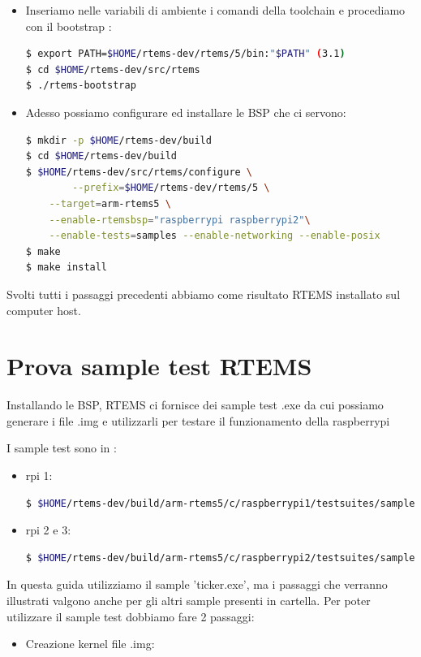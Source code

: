 \documentclass[12pt, a4paper]{article}
\begin{document}
\begin{flushleft}
\begin{itemize}
\item Inseriamo nelle variabili di ambiente i comandi della toolchain e procediamo con il bootstrap : 
\begin{lstlisting}[language=bash] 
$ export PATH=$HOME/rtems-dev/rtems/5/bin:"$PATH" (3.1)
$ cd $HOME/rtems-dev/src/rtems
$ ./rtems-bootstrap
\end{lstlisting}	
	
\item Adesso possiamo configurare ed installare le BSP che ci servono: 
\begin{lstlisting}[language=bash] 
$ mkdir -p $HOME/rtems-dev/build
$ cd $HOME/rtems-dev/build
$ $HOME/rtems-dev/src/rtems/configure \
        --prefix=$HOME/rtems-dev/rtems/5 \
	--target=arm-rtems5 \
	--enable-rtemsbsp="raspberrypi raspberrypi2"\
	--enable-tests=samples --enable-networking --enable-posix
$ make
$ make install	
\end{lstlisting}
		
\end{itemize}

Svolti tutti i passaggi precedenti abbiamo come risultato RTEMS installato sul computer host.
\newpage
\section{Prova sample test RTEMS}

Installando le BSP, RTEMS ci fornisce dei sample test .exe da cui possiamo generare i file .img e utilizzarli per testare il funzionamento della raspberrypi

I sample test sono in : 
\begin{itemize}
\item  rpi 1:
\begin{lstlisting}[language=bash] 
$ $HOME/rtems-dev/build/arm-rtems5/c/raspberrypi1/testsuites/samples
\end{lstlisting}
\item  rpi 2 e 3:
\begin{lstlisting}[language=bash] 
$ $HOME/rtems-dev/build/arm-rtems5/c/raspberrypi2/testsuites/samples
\end{lstlisting}
\end{itemize}

In questa guida utilizziamo il sample 'ticker.exe', ma i passaggi che verranno illustrati valgono anche per gli altri sample presenti in cartella.
Per poter utilizzare il sample test dobbiamo fare 2 passaggi:
\begin{itemize}
\item Creazione kernel file .img:


\end{itemize}
\end{flushleft}
\end{document}
